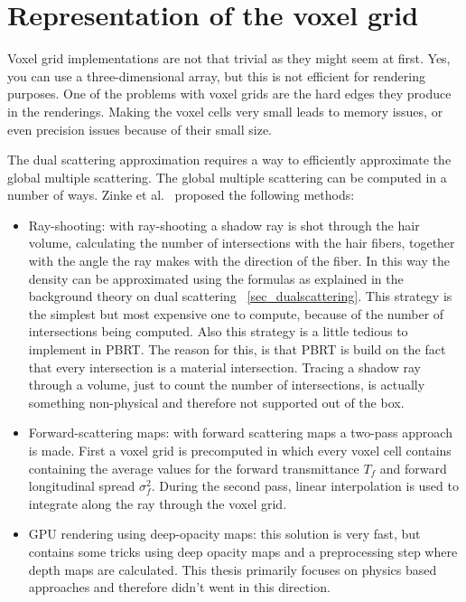 \documentclass[11pt,a4paper]{report}
\begin{document}
\section{Representation of the voxel grid}
\label{sec_voxel_grid}

Voxel grid implementations are not that trivial as they might seem at first. Yes, you can use a three-dimensional array, but this is not efficient for rendering purposes. One of the problems with voxel grids are the hard edges they produce in the renderings. Making the voxel cells very small leads to memory issues, or even precision issues because of their small size.

The dual scattering approximation requires a way to efficiently approximate the global multiple scattering. The global multiple scattering can be computed in a number of ways. Zinke et al.~\cite{zinke} proposed the following methods:

\begin{itemize}
    \item Ray-shooting: with ray-shooting a shadow ray is shot through the hair volume, calculating the number of intersections with the hair fibers, together with the angle the ray makes with the direction of the fiber. In this way the density can be approximated using the formulas as explained in the background theory on dual scattering ~\ref{sec_dualscattering}. This strategy is the simplest but most expensive one to compute, because of the number of intersections being computed. Also this strategy is a little tedious to implement in PBRT. The reason for this, is that PBRT is build on the fact that every intersection is a material intersection. Tracing a shadow ray through a volume, just to count the number of intersections, is actually something non-physical and therefore not supported out of the box.
    \item Forward-scattering maps: with forward scattering maps a two-pass approach is made. First a voxel grid is precomputed in which every voxel cell contains containing the average values for the forward transmittance $T_f$ and forward longitudinal spread $\sigma^2_f$. During the second pass, linear interpolation is used to integrate along the ray through the voxel grid.
    \item GPU rendering using deep-opacity maps: this solution is very fast, but contains some tricks using deep opacity maps and a preprocessing step where depth maps are calculated. This thesis primarily focuses on physics based approaches and therefore didn't went in this direction.
\end{itemize}
\end{document}
